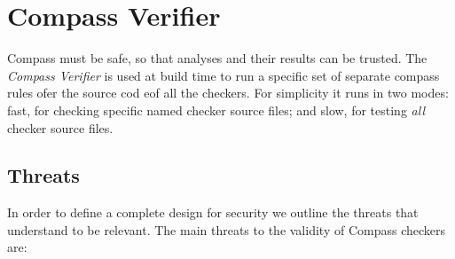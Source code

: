 \section{Compass Verifier}

Compass must be safe, so that analyses and their results can be trusted. 
The {\em Compass Verifier} is used at build time to run a specific set of separate 
compass rules ofer the source cod eof all the checkers.  For simplicity it runs in two
modes: fast, for checking specific named checker source files; and slow, for testing 
{\em all} checker source files.

\subsection{Threats} 

In order to define a complete design for security we outline the threats that
understand to be relevant. The main threats to the validity of Compass checkers are:
